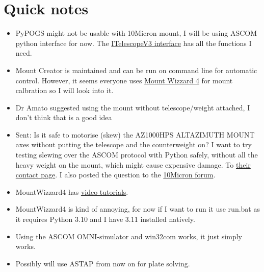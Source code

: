\documentclass[../main.tex]{subfiles}
\begin{document}
\section{Quick notes}
\begin{itemize}
    \item PyPOGS might not be usable with 10Micron mount, I will be using ASCOM python interface for now. The \href{https://ascom-standards.org/Help/Developer/html/T_ASCOM_DeviceInterface_ITelescopeV3.htm}{ ITelescopeV3 interface} has all the functions I need.
    \item Mount Creator is maintained and can be run on command line for automatic control. However, it seems everyone uses \href{https://mworion.github.io/MountWizzard4/}{Mount Wizzard 4} for mount calbration so I will look into it.
    \item Dr Amato suggested using the mount without telescope/weight attached, I don't think that is a good idea
    \item Sent: Is it safe to motorise (skew) the AZ1000HPS ALTAZIMUTH MOUNT axes without putting the telescope and the counterweight on? I want to try testing slewing over the ASCOM protocol with Python safely, without all the heavy weight on the mount, which might cause expensive damage. To \href{https://10micron.eu/en/contact}{their contact page}. I also posted the question to the \href{https://www.10micron.com/forum/viewtopic.php?f=2&t=2283}{10Micron forum}.
    \item MountWizzard4 has \href{https://www.youtube.com/@orion49m/videos}{video tutorials}.
    \item MountWizzard4 is kind of annoying, for now if I want to run it use run.bat as it requires Python 3.10 and I have 3.11 installed natively.
    \item Using the ASCOM OMNI-simulator and win32com works, it just simply works.
    \item Possibly will use ASTAP from now on for plate solving.
\end{itemize}
\end{document}
